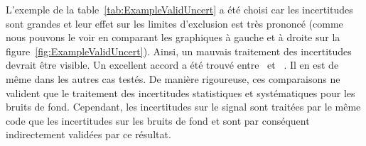 L'exemple de la table~\ref{tab:ExampleValidUncert} a \'et\'e choisi car les incertitudes sont grandes et leur effet sur les limites d'exclusion est tr\`es prononc\'e (comme nous pouvons le voir en comparant les graphiques \`a gauche et \`a droite sur la figure~\ref{fig:ExampleValidUncert}). Ainsi, un mauvais traitement des incertitudes devrait \^etre visible. Un excellent accord a \'et\'e trouv\'e entre \opthylic~et \tifosi~. Il en est de m\^eme dans les autres cas test\'es. De mani\`ere rigoureuse, ces comparaisons ne valident que le traitement des incertitudes statistiques et syst\'ematiques pour les bruits de fond. Cependant, les incertitudes sur le signal sont trait\'ees par le m\^eme code que les incertitudes sur les bruits de fond et sont par cons\'equent indirectement valid\'ees par ce r\'esultat. 



